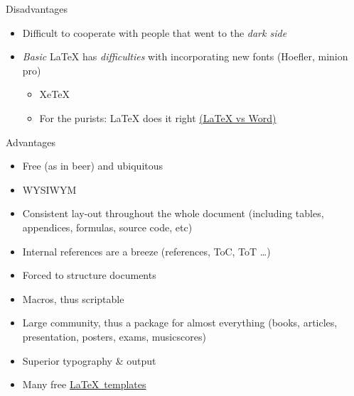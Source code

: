 \documentclass[ignorenonframetext]{beamer}
\begin{document}
{\begin{frame}{Disadvantages}
\begin{itemize}
  \begin{itemize}
  \item
    Learning curve, but
  \item
    hurray for
    \href{https://wch.github.io/latexsheet/latexsheet.pdf}{cheat sheets}
    and Google
  \end{itemize}
\item
  Difficult to cooperate with people that went to the \emph{dark side}
\item
  \emph{Basic} \LaTeX{} has \emph{difficulties} with incorporating new
  fonts (Hoefler, minion pro)

  \begin{itemize}
  \item
    XeTeX  \item
    For the purists: \LaTeX{} does it right
    \href{http://oestrem.com/thingstwice/2007/05/latex-vs-word-vs-writer/}{(\LaTeX{}
    vs Word)}
  \end{itemize}
\end{itemize}

\end{frame}

\begin{frame}{Advantages}

\begin{itemize}
\item
  Free (as in beer) and ubiquitous
\item
  WYSIWYM
\item
  Consistent lay-out throughout the whole document (including tables,
  appendices, formulas, source code, etc)
\item
  Internal references are a breeze (references, ToC, ToT \ldots{})
\item
  Forced to structure documents
\item
  Macros, thus scriptable
\item
  Large community, thus a package for almost everything (books,
  articles, presentation, posters, exams, musicscores)
\item
  Superior typography \& output
\item
  Many free \href{https://www.overleaf.com/latex/templates/}{\LaTeX~templates}
\end{itemize}

\end{frame}

}
\end{document}
